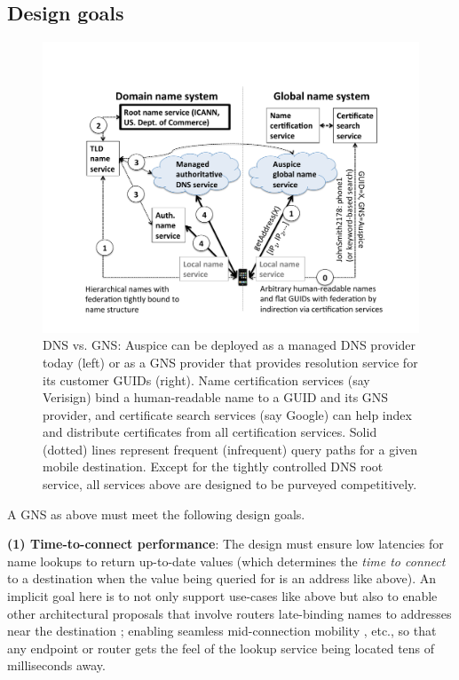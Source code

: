 \subsection{Design goals}\vsp
\label{sec:design_goals}

\begin{figure}[htbp]
\begin{center}
\includegraphics[scale=0.25]{auspice/figure/DNS-GNS.pdf}
\caption{\small{DNS vs. GNS: Auspice can be deployed as a managed DNS provider today (left) or as a GNS provider that provides resolution service for its customer GUIDs (right). Name certification services (say Verisign) bind a human-readable name to a GUID and its GNS provider, and certificate search services (say Google) can help index and distribute certificates from all certification services. Solid (dotted) lines represent frequent (infrequent) query paths for a given mobile destination. Except for the tightly controlled DNS root  service, all services above are designed to be purveyed competitively.} 
}\label{fig:DNS_GNS}
\end{center}
\end{figure}

 
 A GNS as above must meet the following design goals.

{\bf (1) Time-to-connect performance}: The design must ensure low latencies  for name lookups to return up-to-date values (which determines the {\em time to connect} to a destination when the value being queried for is an address like above).  An implicit goal here is to not only support use-cases like above but also to enable other architectural proposals that involve routers late-binding names to addresses near the destination \cite{serval,MobilityFirst-UMASS}; enabling seamless mid-connection mobility \cite{Migrate,ECCP}, etc., so that any endpoint or router gets the feel of the lookup service being located tens of milliseconds away.

